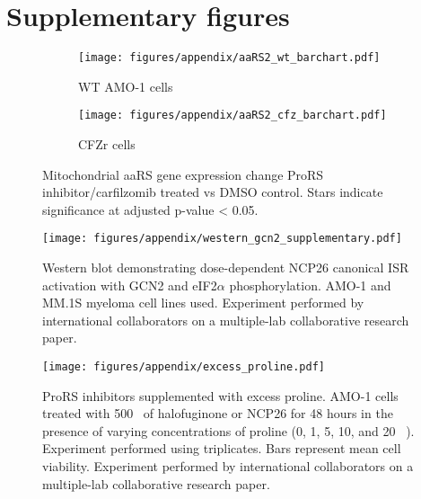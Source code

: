 \chapter{Supplementary figures}

\begin{figure}[h]
\centering
\begin{subfigure}{\textwidth}
    \texttt{[image: figures/appendix/aaRS2\_wt\_barchart.pdf]}
    \caption{WT AMO-1 cells}
\end{subfigure}
\medskip
\begin{subfigure}{\textwidth}
    \texttt{[image: figures/appendix/aaRS2\_cfz\_barchart.pdf]}
    \caption{CFZr cells}
\end{subfigure}
\caption[Bulk RNA-seq: mitochndrial aaRS gene expression change]{Mitochondrial aaRS gene expression change ProRS inhibitor/carfilzomib treated vs DMSO control.
Stars indicate significance at adjusted p-value < 0.05.}
\label{fig:ARS2_barchart}
\end{figure}

\begin{figure}[h]
\centering
\texttt{[image: figures/appendix/western\_gcn2\_supplementary.pdf]}
\caption[GCN2 and eIF2$\alpha$ western blot ]{Western blot demonstrating dose-dependent NCP26 canonical ISR activation with GCN2 and eIF2$\alpha$ phosphorylation. AMO-1 and MM.1S myeloma cell lines used.
Experiment performed by international collaborators on a multiple-lab collaborative research paper\cite{bottpreclinical2022}.
}
\label{fig:sup_western}
\end{figure}

\begin{figure}[h]
\centering
\texttt{[image: figures/appendix/excess\_proline.pdf]}
\caption[ProRS inhibitor treatment with proline supplementation]{ProRS inhibitors supplemented with excess proline.
AMO-1 cells treated with 500\si{\nano\Molar} of halofuginone or NCP26 for 48 hours in the presence of varying concentrations of proline (0, 1, 5, 10, and 20 \si{\milli\Molar}).
Experiment performed using triplicates.
Bars represent mean cell viability.
Experiment performed by international collaborators on a multiple-lab collaborative research paper\cite{bottpreclinical2022}.
}
\label{fig:sup_proline_excess}
\end{figure}

